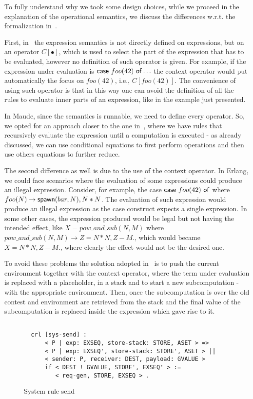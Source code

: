 \documentclass{article}[12pt,a4paper]
\theoremstyle{definition}
\begin{document}
To fully understand why we took some design choices, while we proceed in the
explanation of the operational semantics, we discuss the differences w.r.t. the
formalization in~\cite{Gonzalez-AbrilV21}.

First, in~\cite{Gonzalez-AbrilV21} the expression semantics is not directly
defined on expressions, but on an
operator $C[\bullet]$, which is used to select the part of the expression that has to be
evaluated, however no definition of such operator is given. For example, if the expression under evaluation is
$\mathsf{case}~foo(42)~\mathsf{of}\ldots$ the context operator would put automatically
the focus on $foo(42)$, i.e., $C[foo(42)]$. The convenience of using such
operator is that in this way one can avoid the definition of all the rules to
evaluate inner parts of an expression, like in the example just presented.

In Maude, since the semantics is
runnable, we need to define every operator. So, we opted for an approach closer
to the one in~\cite{LaneseNPV18}, where we have rules that recursively evaluate
the expression until a computation is executed - as already discussed, we can use
conditional equations to first perform operations and then use others equations
to further reduce.

The second difference as well is due to the use of the context operator. In
Erlang, we
could face scenarios where the evaluation of some expressions could
produce an illegal expression. Consider, for example, the case
$\mathsf{case}~foo(42)~\mathsf{of}$ where $foo(N) \rightarrow \mathsf{spawn}(bar,N), N*N$.
The evaluation of such expression would produce an illegal expression as the case construct expects a single expression. In
some other cases, the expression produced would be legal but not having the
intended effect, like $X=pow\_and\_sub(N,M)$ where $pow\_and\_sub(N,M)
\rightarrow Z = N*N, Z-M.$, which would became $X=N*N, Z-M.$, where clearly the
effect would not be the desired one.

To avoid these problems the solution adopted
in~\cite{Gonzalez-AbrilV21} is to push the current environment together with the
context operator, where the term under evaluation is replaced with a
placeholder, in a stack and to start a new subcomputation - with the appropriate
environment. Then, once the
subcomputation is over the old contest and environment are retrieved from the
stack and the final value of the subcomputation is replaced inside the expression
which gave rise to it.

\begin{figure}[t]
  \centering
\begin{verbatim}

  crl [sys-send] :
      < P | exp: EXSEQ, store-stack: STORE, ASET > =>
      < P | exp: EXSEQ', store-stack: STORE', ASET > ||
      < sender: P, receiver: DEST, payload: GVALUE >
      if < DEST ! GVALUE, STORE', EXSEQ' > :=
         < req-gen, STORE, EXSEQ > .
\end{verbatim}
  \caption{System rule send}
  \label{fig:rule-send}
\end{figure}
\end{document}
